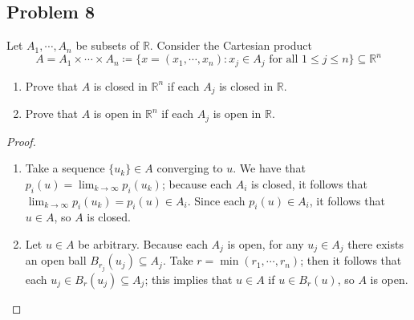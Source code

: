 \documentclass{article}
\begin{document}
\subsection*{Problem 8}
Let $A_1, \cdots , A_n$ be subsets of $\mathbb{R}$. Consider the Cartesian product
\[ A = A_1 \times \cdots \times A_n \coloneqq \{x = (x_1, \cdots, x_n) \colon x_j \in A_j \text{ for all } 1 \leq j \leq n\} \subseteq \mathbb{R}^n\]
\begin{enumerate}
    \item Prove that $A$ is closed in $\mathbb{R}^n$ if each $A_j$ is closed in $\mathbb{R}$.
    \item Prove that $A$ is open in $\mathbb{R}^n$ if each $A_j$ is open in $\mathbb{R}$.
\end{enumerate}
\begin{proof}
\begin{enumerate}
    \item Take a sequence $\{u_k\} \in A$ converging to $u$. We have that $p_i(u) = \lim_{k \to \infty} p_i(u_k)$; because each $A_i$ is closed, it follows that $\lim_{k \to \infty} p_i(u_k) = p_i(u) \in A_i$. Since each $p_i(u) \in A_i$, it follows that $u \in A$, so $A$ is closed.
    \item Let $u \in A$ be arbitrary. Because each $A_j$ is open, for any $u_j \in A_j$ there exists an open ball $B_{r_j}(u_j) \subseteq A_j$. Take $r = \min{(r_1,\cdots,r_n)}$; then it follows that each $u_j \in B_r(u_j) \subseteq A_j$; this implies that $u \in A$ if $u \in B_r(u)$, so $A$ is open.
\end{enumerate}

\end{proof}
\end{document}
